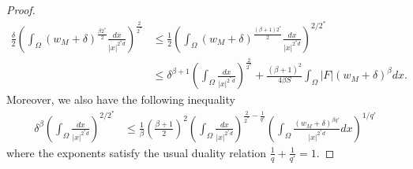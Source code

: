 \documentclass[11pt]{article}
\begin{document}
\begin{proof}
\begin{equation}
\begin{aligned}
    \frac{\delta}{2} \left( \int_\Omega (w_M + \delta)^{\frac{\beta 2^*}{2}} \frac{dx}{|x|^{2^* d}} \right)^{\frac{2}{2^*}}
    &\leq \frac{1}{2} \left( \int_\Omega (w_M + \delta)^{\frac{(\beta + 1) 2^*}{2}} \frac{dx}{|x|^{2^* d}} \right)^{2/2^*} \\
    &\leq \delta^{\beta + 1} \left( \int_\Omega \frac{dx}{|x|^{2^* d}} \right)^{\frac{2}{2^*}} + \frac{(\beta + 1)^2}{4\beta S} \int_\Omega |F| (w_M + \delta)^\beta dx.
\end{aligned}
\label{eq:improved_estimate_main}
\end{equation}
Moreover, we also have the following inequality
\begin{equation}
\begin{aligned}
    \delta^\beta \left( \int_\Omega \frac{dx}{|x|^{2^* d}} \right)^{2/2^*}
    &\leq \frac{1}{\beta} \left( \frac{\beta + 1}{2} \right)^2 
    \left( \int_\Omega \frac{dx}{|x|^{2^* d}} \right)^{\frac{2}{2^*} - \frac{1}{q'}} 
    \left( \int_\Omega \frac{(w_M + \delta)^{\beta q'}}{|x|^{2^* d}} dx \right)^{1/q'}
\end{aligned}
\label{eq:holder_embedding_estimate}
\end{equation}
where the exponents satisfy the usual duality relation $\frac{1}{q} + \frac{1}{q'} = 1$.


\end{proof}
\end{document}
